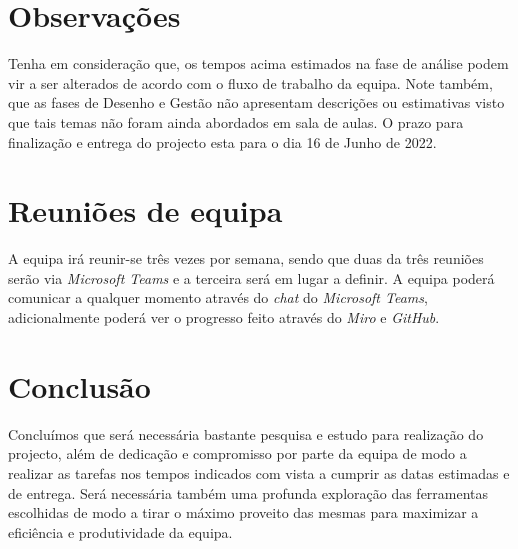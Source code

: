 \documentclass[a4paper]{article}
\begin{document}
\section{Observações}
Tenha em consideração que, os tempos acima estimados na fase de análise podem vir a ser alterados de acordo com o fluxo de trabalho da equipa. Note também, que as fases de Desenho e Gestão não apresentam descrições ou estimativas visto que tais temas não foram ainda abordados em sala de aulas.
O prazo para finalização e entrega do projecto esta para o dia 16 de Junho de 2022.

\section{Reuniões de equipa}
A equipa irá reunir-se três vezes por semana, sendo que duas da três reuniões serão via \textit{Microsoft Teams} e a terceira será em lugar a definir.
A equipa poderá comunicar a qualquer momento através do \textit{chat} do \textit{Microsoft Teams}, adicionalmente poderá ver o progresso feito através do \textit{Miro} e \textit{GitHub}.

\newpage
\section{Conclusão}
Concluímos que será necessária bastante pesquisa e estudo para realização do projecto, além de dedicação e compromisso por parte da equipa de modo a realizar as tarefas nos tempos indicados com vista a cumprir as datas estimadas e de entrega. Será necessária também uma profunda exploração das ferramentas escolhidas de modo a tirar o máximo proveito das mesmas para maximizar a eficiência e produtividade da equipa.

\newpage


\end{document}
